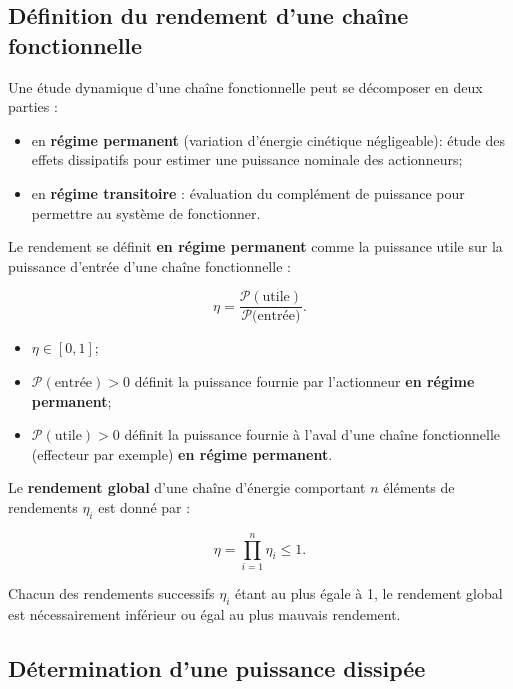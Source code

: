 \documentclass[10pt,fleqn]{article} %
\begin{document}
\subsection{Définition du rendement d'une chaîne fonctionnelle}

Une étude dynamique d'une chaîne fonctionnelle peut se décomposer en deux parties :
\begin{itemize}
\item en \textbf{régime permanent} (variation d'énergie cinétique négligeable): étude des effets dissipatifs pour estimer une puissance nominale des actionneurs;
\item en \textbf{régime transitoire} : évaluation du complément de puissance pour permettre au système de fonctionner.
\end{itemize} 

\begin{defi}
Le rendement se définit \textbf{en régime permanent} comme la puissance utile sur la puissance d'entrée d'une chaîne fonctionnelle : 

$$
\eta=\dfrac{\mathcal{P}(\text{utile})}{\mathcal{P}(\text{entrée)}}.
$$

\begin{itemize}
\item $\eta\in\left[0,1\right]$;
\item $\mathcal{P}(\text{entrée})>0$ définit la puissance fournie par l'actionneur \textbf{en régime permanent};
\item $\mathcal{P}(\text{utile})>0$ définit la puissance fournie à l'aval d'une chaîne fonctionnelle (effecteur par exemple) \textbf{en régime permanent}.
\end{itemize}
\end{defi}

\begin{prop}
Le \textbf{rendement global} d'une chaîne d'énergie comportant $n$ éléments de rendements $\eta_i$ est donné par : 

$$
\displaystyle{\eta=\prod_{i=1}^n\eta_i\leq 1}.
$$

Chacun des rendements successifs $\eta_i$ étant au plus égale à 1, le rendement global est nécessairement inférieur ou égal au plus mauvais rendement.
\end{prop}

\subsection{Détermination d'une puissance dissipée}
\end{document}
